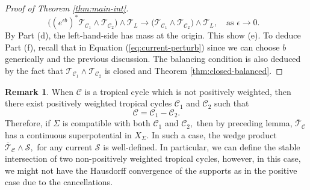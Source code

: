 \documentclass[11pt]{amsart}
\def\Log{{\rm Log}}
\theoremstyle{definition}
\newtheorem{remark}[theorem]{Remark}
\newcommand{\Z}{\mathbb{Z}}
\newcommand{\lto}{\longrightarrow}
\newcommand{\cC}{\mathcal{C}}
\newcommand{\sT}{\mathscr{T}}
\newcommand{\sS}{\mathscr{S}}
\newcommand{\supp}[1]{{\mathrm{supp}(#1)}}
\begin{document}
\begin{proof}[Proof of Theorem \ref{thm:main-int}]
$$
\big( (e^{\epsilon b})^* \sT_{\cC_1} \wedge \sT_{\cC_2} \big) \wedge \sT_{L} \lto \big( \sT_{\cC_1} \wedge \sT_{\cC_2} \big) \wedge \sT_{L}, \quad \text{as $\epsilon\to 0.$ } 
$$
By Part (d), the left-hand-side has mass at the origin. This show (e). 
\vskip 2mm
To deduce Part (f), recall that in Equation (\ref{eq:current-perturb}) since we can choose $b$ generically and the previous discussion. The balancing condition is also deduced by the fact that $\sT_{\cC_1} \wedge \sT_{\cC_2}$ is closed and Theorem \ref{thm:closed-balanced}.
%
%
%
%
\end{proof}

\begin{remark}\label{rem:non-positive-int}
When $\cC$ is a tropical cycle which is not positively weighted, then there exist positively weighted tropical cycles $\cC_1$ and $\cC_2$ such that
    $$
    \cC = \cC_1 - \cC_2.
    $$
    Therefore, if $\Sigma$ is compatible with both $\cC_1$ and $\cC_2,$ then by preceding lemma, $\overline{\sT}_{\cC}$ has a continuous superpotential in $X_{\Sigma}.$ In such a case, the wedge product $\overline{\sT}_{\cC} \wedge \sS,$ for any current $\sS$ is well-defined. In particular, we can define the stable intersection of two non-positively weighted tropical cycles, however, in this case, we might not have the Hausdorff convergence of the supports as in the positive case due to the cancellations.  
\end{remark}
\end{document}
